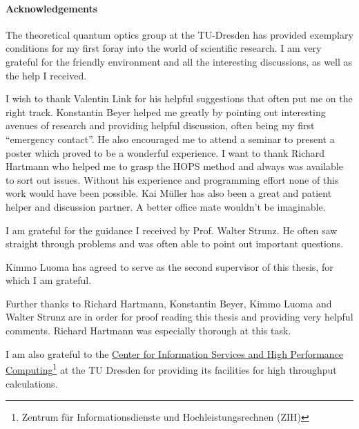 \paragraph{Acknowledgements}
The theoretical quantum optics group at the TU-Dresden has provided
exemplary conditions for my first foray into the world of scientific
research. I am very grateful for the friendly environment and all the
interesting discussions, as well as the help I received.

I wish to thank Valentin Link for his helpful suggestions that often
put me on the right track. Konstantin Beyer helped me greatly by
pointing out interesting avenues of research and providing helpful
discussion, often being my first ``emergency contact''. He also
encouraged me to attend a seminar to present a poster which proved to
be a wonderful experience. I want to thank Richard Hartmann who helped
me to grasp the HOPS method and always was available to sort out
issues. Without his experience and programming effort none of this
work would have been possible. Kai M\"uller has also been a great and
patient helper and discussion partner. A better office mate wouldn't
be imaginable.

I am grateful for the guidance I received by Prof. Walter Strunz. He
often saw straight through problems and was often able to point out
important questions.

Kimmo Luoma has agreed to serve as the second supervisor of this
thesis, for which I am grateful.

Further thanks to Richard Hartmann, Konstantin Beyer, Kimmo Luoma and
Walter Strunz are in order for proof reading this thesis and providing
very helpful comments. Richard Hartmann was especially thorough at
this task.

I am also grateful to the \href{https://tu-dresden.de/zih}{Center for
  Information Services and High Performance
  Computing}\footnote{Zentrum für Informationsdienste und
  Hochleistungsrechnen (ZIH)} at the TU Dresden for providing its
facilities for high throughput calculations.
